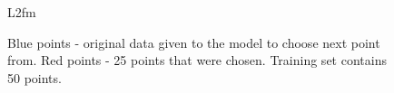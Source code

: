 \documentclass[a4paper]{article}
\begin{document}
\begin{figure}[h]
\begin{minipage}[h]{0.49\linewidth}
\end{minipage}
\hfill
\begin{minipage}[h]{0.49\linewidth}
 L2fm
\end{minipage}
\caption{Blue points - original data given to the model to choose next point from. Red points - 25 points that were chosen. Training set contains 50 points.}
\label{scoreplots}
\end{figure}
\end{document}
